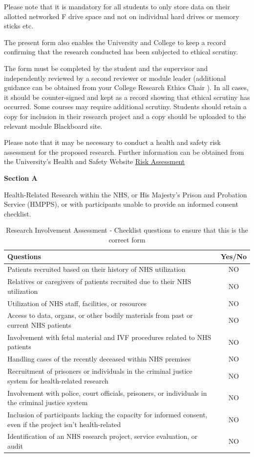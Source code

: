 \documentclass{article}
\begin{document}
Please note that it is mandatory for all students to only store data on their allotted networked F drive space and not on individual hard drives or memory sticks etc. 

The present form also enables the University and College to keep a record confirming that the research conducted has been subjected to ethical scrutiny.

The form must be completed by the student and the supervisor and independently reviewed by a second reviewer or module leader (additional guidance can be obtained from your College Research Ethics Chair ). In all cases, it should be counter-signed and kept as a record showing that ethical scrutiny has occurred. Some courses may require additional scrutiny. Students should retain a copy for inclusion in their research project and a copy should be uploaded to the relevant module Blackboard site. 

Please note that it may be necessary to conduct a health and safety risk assessment for the proposed research. Further information can be obtained from the University’s Health and Safety Website \href{https://sheffieldhallam.sharepoint.com/sites/3069/SitePages/Risk-Assessment.aspx}{Risk Assessment}

\textbf{Section A}

Health-Related Research within the NHS, or His Majesty’s Prison and Probation Service (HMPPS), or with participants unable to provide an informed consent checklist.
\begin{table}[ht!]
\centering
\begin{tabular}{|p{10cm}|c|}
\hline
Questions & Yes/No \\
\hline
Patients recruited based on their history of NHS utilization & NO \\
Relatives or caregivers of patients recruited due to their NHS utilization & NO \\
Utilization of NHS staff, facilities, or resources & NO \\
Access to data, organs, or other bodily materials from past or current NHS patients & NO \\
Involvement with fetal material and IVF procedures related to NHS patients & NO \\
Handling cases of the recently deceased within NHS premises & NO \\
Recruitment of prisoners or individuals in the criminal justice system for health-related research & NO \\
Involvement with police, court officials, prisoners, or individuals in the criminal justice system & NO \\
Inclusion of participants lacking the capacity for informed consent, even if the project isn't health-related & NO \\
Identification of an NHS research project, service evaluation, or audit & NO \\
\hline
\end{tabular}
\caption{Research Involvement Assessment - Checklist questions to ensure that this is the correct form}
\end{table}
\end{document}
